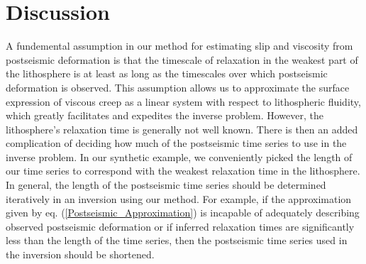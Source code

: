 \documentclass[extra]{gji}
\begin{document}

\section{Discussion}

A fundemental assumption in our method for estimating slip and
viscosity from postseismic deformation is that the timescale of
relaxation in the weakest part of the lithosphere is at least as long
as the timescales over which postseismic deformation is observed.
This assumption allows us to approximate the surface expression of
viscous creep as a linear system with respect to lithospheric
fluidity, which greatly facilitates and expedites the inverse problem.
However, the lithosphere's relaxation time is generally not well
known.  There is then an added complication of deciding how much of
the postseismic time series to use in the inverse problem.  In our
synthetic example, we conveniently picked the length of our time
series to correspond with the weakest relaxation time in the
lithosphere. In general, the length of the postseismic time series
should be determined iteratively in an inversion using our method.
For example, if the approximation given by
eq. (\ref{Postseismic_Approximation}) is incapable of adequately
describing observed postseismic deformation or if inferred relaxation
times are significantly less than the length of the time series, then
the postseismic time series used in the inversion should be shortened.
\end{document}
